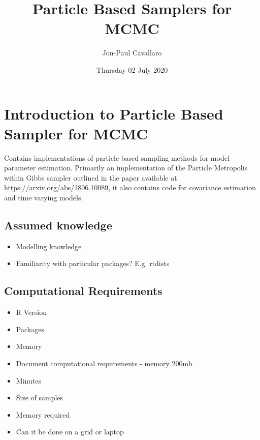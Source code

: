 \documentclass[]{book}
\title{Particle Based Samplers for MCMC}
\author{Jon-Paul Cavallaro}
\date{Thursday 02 July 2020}
\providecommand{\tightlist}{%
  \setlength{\itemsep}{0pt}\setlength{\parskip}{0pt}}
\begin{document}
\maketitle

{
\setcounter{tocdepth}{1}
\tableofcontents
}
\hypertarget{introduction-to-particle-based-sampler-for-mcmc}{%
\chapter{Introduction to Particle Based Sampler for MCMC}\label{introduction-to-particle-based-sampler-for-mcmc}}

Contains implementations of particle based sampling methods for model parameter estimation. Primarily an implementation of the Particle Metropolis within Gibbs sampler outlined in the paper available at \url{https://arxiv.org/abs/1806.10089}, it also contains code for covariance estimation and time varying models.

\hypertarget{assumed-knowledge}{%
\section{Assumed knowledge}\label{assumed-knowledge}}

\begin{itemize}
\tightlist
\item
  Modelling knowledge
\item
  Familiarity with particular packages? E.g. rtdists
\end{itemize}

\hypertarget{computational-requirements}{%
\section{Computational Requirements}\label{computational-requirements}}

\begin{itemize}
\tightlist
\item
  R Version
\item
  Packages
\item
  Memory
\item
  Document computational requirements - memory 200mb
\item
  Minutes
\item
  Size of samples
\item
  Memory required
\item
  Can it be done on a grid or laptop
\end{itemize}
\end{document}
